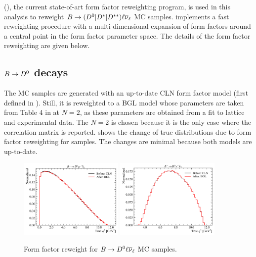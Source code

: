 \Hammer (\cite{Bernlochner_2020}),
the current state-of-art form factor reweighting program, is used
in this analysis to reweight
$B \rightarrow ({{D}^0}| {{D}^*}| D^{**}) {\ell}{{\overline{\nu}}_\ell}$ MC samples.
\Hammer implements a fast reweighting procedure with a multi-dimensional
expansion of form factors around a central point in the form factor parameter
space.
The details of the form factor reweighting are given below.

\subsection{$B \rightarrow {\ensuremath{{D}^0}}$ decays}

The \Dz MC samples are generated with an up-to-date CLN form factor model
(first defined in \cite{Caprini_1998}).
Still, it is reweighted to a BGL model whose parameters are taken
from Table 4 in \cite{Bigi_2016} at $N = 2$, as these
parameters are obtained from a fit to lattice and experimental data.
The $N = 2$ is chosen because it is the only case where the correlation matrix
is reported.
 shows the change of true \qSq distributions due to form factor
reweighting for \Dz samples.
The changes are minimal because both models are up-to-date.

\begin{figure}[htb]
    \centering
    \includegraphics[width=0.45\textwidth]{
        ./figs-mc-correction/reweighting-form-factors/norm/D0Mu.pdf
    }
    \includegraphics[width=0.45\textwidth]{
        ./figs-mc-correction/reweighting-form-factors/sig/D0Tau.pdf
    }
    \caption{
        Form factor reweight for $B \rightarrow {\ensuremath{{D}^0}} {\ensuremath{\ell}}{\ensuremath{{\overline{\nu}}_\ell}}$ MC samples.
    }
    \label{fig:ff-d0}
\end{figure}


